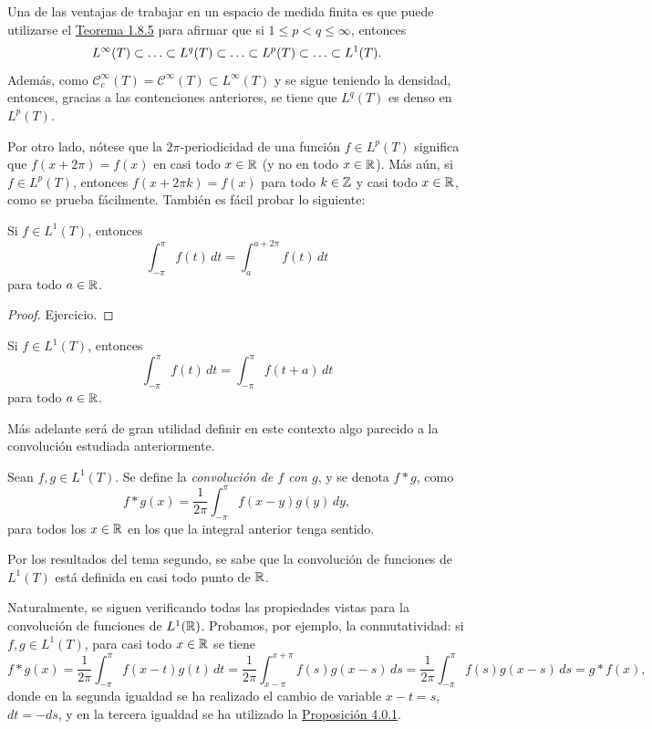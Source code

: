 \documentclass[a4paper, 11pt, oneside]{report}
\begin{document}
Una de las ventajas de trabajar en un espacio de medida finita es que puede utilizarse el \hyperref[teo:1.9.5]{\color{c1}Teorema 1.8.5} para afirmar que si $1 \leq p < q \leq \infty$, entonces
\[L^\infty(T) \subset \mathellipsis \subset L^q(T) \subset \mathellipsis \subset L^p(T) \subset \mathellipsis \subset L^1(T).\] 
Además, como $\mathcal{C}^\infty_c(T) = \mathcal{C}^\infty(T) \subset L^\infty(T)$ y se sigue teniendo la densidad, entonces, gracias a las contenciones anteriores, se tiene que $L^q(T)$ es denso en $L^p(T)$.

Por otro lado, nótese que la $2\pi$-periodicidad de una función $f \in L^p(T)$ significa que $f(x+2\pi) = f(x)$ en casi todo $x \in \mathbb R$ (y no en todo $x \in \mathbb R$). Más aún, si $f \in L^p(T)$, entonces $f(x+2\pi k) = f(x)$ para todo $k \in \mathbb Z$ y casi todo $x \in \mathbb R$, como se prueba fácilmente. También es fácil probar lo siguiente:

\begin{proposition}\label{pro:4.0.1}
  Si $f \in L^1(T)$, entonces
  \[\int_{-\pi}^\pi f(t) \, dt = \int_a^{a+2\pi} f(t) \, dt\]
  para todo $a \in \mathbb R$.
\end{proposition}

\begin{proof}
  Ejercicio.
\end{proof}

\begin{corollary}\label{cor:4.0.2}
  Si $f \in L^1(T)$, entonces
  \[\int_{-\pi}^\pi f(t) \, dt = \int_{-\pi}^\pi f(t+a) \, dt\]
  para todo $a \in \mathbb R$.
\end{corollary}

Más adelante será de gran utilidad definir en este contexto algo parecido a la convolución estudiada anteriormente.

\begin{definition}
  Sean $f,g \in L^1(T)$. Se define la \emph{convolución de $f$ con $g$}, y se denota $f \ast g$, como
  \[f \ast g (x)=\frac{1}{2\pi}\int_{-\pi}^\pi f(x-y)g(y) \, dy,\]
  para todos los $x \in \mathbb R$ en los que la integral anterior tenga sentido.
\end{definition}
Por los resultados del tema segundo, se sabe que la convolución de funciones de $L^1(T)$ está definida en casi todo punto de $\mathbb R$. 

Naturalmente, se siguen verificando todas las propiedades vistas para la convolución de funciones de $L^1(\mathbb R)$. Probamos, por ejemplo, la conmutatividad: si $f,g \in L^1(T)$, para casi todo $x \in \mathbb R$ se tiene
\[f \ast g(x) = \frac{1}{2\pi}\int_{-\pi}^\pi f(x-t)g(t) \, dt = \frac{1}{2\pi}\int_{x-\pi}^{x+\pi}f(s)g(x-s) \, ds = \frac{1}{2\pi}\int_{-\pi}^\pi f(s)g(x-s) \, ds = g \ast f (x),\]
donde en la segunda igualdad se ha realizado el cambio de variable $x-t=s$, $dt = -ds$, y en la tercera igualdad se ha utilizado la \hyperref[pro:4.0.1]{\color{c1}Proposición 4.0.1}.
\end{document}
